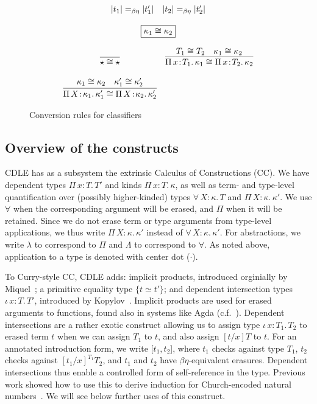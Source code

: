 \documentclass{article}
\newcommand{\abs}[4]{{#1}\, #2\! : \! #3.\, #4}
\begin{document}
\begin{figure}
\[\begin{array}{c}
\begin{array}{cc}
{        }{
         |t_1| =_{\beta\eta} |t_1'| \quad |t_2| =_{\beta\eta} |t_2'|
        }
      \end{array}
      \\ \\ \fbox{\(\kappa_1 \cong \kappa_2\)}
      \\ \\
      \begin{array}{cc}
        \infer{
         \star \cong \star
        }{}
        & \infer{
           \abs{\Pi}{x}{T_1}{\kappa_1} \cong \abs{\Pi}{x}{T_2}{\kappa_2}
          }{
           T_1 \cong T_2
           \quad \kappa_1 \cong \kappa_2
          }
        \\ \\
        \infer{
         \abs{\Pi}{X}{\kappa_1}{\kappa_1'} \cong \abs{\Pi}{X}{\kappa_2}{\kappa_2'}
        }{
         \kappa_1 \cong \kappa_2
         \quad \kappa_1' \cong \kappa_2'
        }
      \end{array}
    \end{array}
  \]
  \caption{Conversion rules for classifiers}
  \label{fig:conv}
\end{figure}  

\subsection{Overview of the constructs}
\label{sec:overview}

CDLE has as a subsystem the extrinsic Calculus of
Constructions (CC).  We have dependent types
$\abs{\Pi}{x}{T}{T'}$ and kinds $\abs{\Pi}{x}{T}{\kappa}$, as well as
term- and type-level quantification over (possibly higher-kinded)
types $\abs{\forall}{X}{\kappa}{T}$ and
$\abs{\Pi}{X}{\kappa}{\kappa'}$.  We use $\forall$ when the
corresponding argument will be erased, and $\Pi$ when it will be
retained.  Since we do not erase term or type arguments from
type-level applications, we thus write $\abs{\Pi}{X}{\kappa}{\kappa'}$
instead of $\abs{\forall}{X}{\kappa}{\kappa'}$.
For abstractions, we write $\lambda$ to
correspond to $\Pi$ and $\Lambda$ to correspond to $\forall$.  As noted
above, application to a type is denoted with center dot ($\cdot$).

To Curry-style CC, CDLE adds: implicit products, introduced orginially
by Miquel~\cite{miquel01}; a primitive equality type $\{ t \simeq
t'\}$; and dependent intersection types $\abs{\iota}{x}{T}{T'}$,
introduced by Kopylov~\cite{kopylov03}.  Implicit products are used
for erased arguments to functions, found also in systems like Agda
(c.f.~\cite{mishraLinger08}).  Dependent intersections are a rather
exotic construct allowing us to assign type $\abs{\iota}{x}{T_1}{T_2}$ to
erased term $t$ when we can assign $T_1$ to $t$, and also assign
$[t/x]T$ to $t$.  For an annotated introduction form, we write
$[t_1,t_2$], where $t_1$ checks against type $T_1$, $t_2$ checks against
$[t_1/x]^{T_1}T_2$, and $t_1$ and $t_2$ have $\beta\eta$-equivalent
erasures.  Dependent intersections thus enable a controlled form of
self-reference in the type.  Previous work showed how to use this to
derive induction for Church-encoded natural numbers~\cite{stump18}.
We will see below further uses of this construct.
\end{document}
